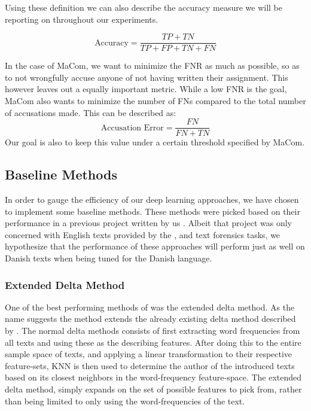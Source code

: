 Using these definition we can also describe the accuracy measure we will be
reporting on throughout our experiments.

\begin{equation}
    \text{Accuracy} = \frac{TP + TN}{TP + FP + TN + FN}
\end{equation}


In the case of MaCom, we want to minimize the \gls{FNR} as much as possible, so
as to not wrongfully accuse anyone of not having written their assignment.
This however leaves out a equally important metric. While a low \gls{FNR}
is the goal, MaCom also wants to minimize the number of \gls{FN}s compared
to the total number of accusations made. This can be described as:
$$
\text{Accusation Error} = \frac{FN}{FN + TN}
$$
Our goal is also to keep this value under a certain threshold specified by MaCom.


\subsection{Baseline Methods}

In order to gauge the efficiency of our deep learning approaches, we have chosen
to implement some baseline methods. These methods were picked based on their
performance in a previous project written by us \cite{US}. Albeit that project
was only concerned with English texts provided by the \cite{pan:2015}, and
\cite{pan:2014} text forensics tasks, we hypothesize that the performance of
these approaches will perform just as well on Danish texts when being tuned for
the Danish language.


\subsubsection{Extended Delta Method}

One of the best performing methods of \cite{US} was the extended delta method.
As the name suggests the method extends the already existing delta method
described by \cite{evert2015towards}. The normal delta methods consists of first
extracting word frequencies from all texts and using these as the describing
features. After doing this to the entire sample space of texts, and applying a
linear transformation to their respective feature-sets, \gls{KNN} is then used
to determine the author of the introduced texts based on its closest neighbors
in the word-frequency feature-space. The extended delta method, simply expands
on the set of possible features to pick from, rather than being limited to only
using the word-frequencies of the text.


